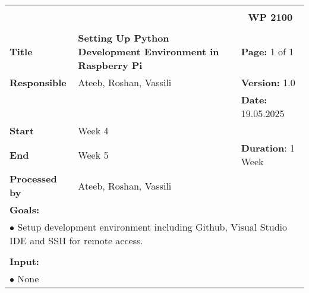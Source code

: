 \begin{table}[!h]
    \begin{center}
        \begin{tabular}{|p{}||p{}|p{}||p{}|}
            \hline
            \multicolumn{3}{|l||}{\textbf{}} & \multicolumn{1}{c|}{}\\
            \multicolumn{3}{|l||}{\textbf{}} & \multicolumn{1}{c|}{\textbf{WP 2100}}\\
            \multicolumn{3}{|l||}{\textbf{}} & \multicolumn{1}{c|}{}\\
            \hline\hline
            \textbf{Title} & \multicolumn{2}{p{.40\columnwidth}||}{\textbf{Setting Up
Python Development Environment in Raspberry Pi}}
            & \textbf{Page:} 1 of 1\\
            \hline
            \textbf{Responsible} & \multicolumn{2}{l||}{Ateeb, Roshan, Vassili} & \textbf{Version:} 1.0\\
            \hline
            \multicolumn{3}{|l||}{} & \textbf{Date: } 19.05.2025 \\
            \hline\hline
            \textbf{Start} & \multicolumn{2}{l||}{Week 4} & \\
            \hline
            \textbf{End} & \multicolumn{2}{l||}{Week 5} & \textbf{Duration}: 1 Week\\
            \hline\hline
            \textbf{Processed by} & \multicolumn{3}{l|}{Ateeb, Roshan, Vassili}\\
            \hline\hline
            \multicolumn{4}{|p{.95\columnwidth}|}{\textbf{Goals:}}\\
            \multicolumn{4}{|p{.95\columnwidth}|}{$\bullet$ Setup development environment including Github, Visual Studio IDE and SSH for remote access.}\\

            \multicolumn{4}{|p{.95\columnwidth}|}{}\\
            \multicolumn{4}{|p{.95\columnwidth}|}{\textbf{Input:}}\\
            \multicolumn{4}{|p{.95\columnwidth}|}{$\bullet$ None }\\


\end{tabular}
\end{center}
\end{table}
